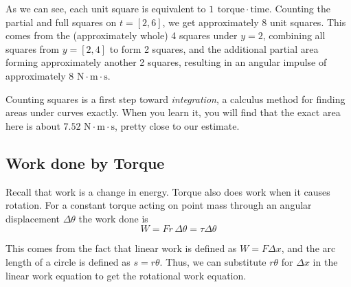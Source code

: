 \begin{Answer}[ref={ex:ang_imp}]
As we can see, each unit square is equivalent to $1 \,\ \mathrm{torque}\cdot \mathrm{time}$. Counting the partial and full squares on $t=[2,6]$, we get approximately 8 unit squares. This comes from the (approximately whole) 4 squares under $y=2$, combining all squares from $y=[2,4]$ to form 2 squares, and the additional partial area forming approximately another 2 squares, resulting in an angular impulse of approximately $8 \text{ N}\cdot \text{m} \cdot \text{s}$. 

Counting squares is a first step toward \emph{integration}, a calculus method for finding areas under curves exactly. When you learn it, you will find that the exact area here is about $7.52 \text{ N}\cdot \text{m} \cdot \text{s}$, pretty close to our estimate.
\end{Answer}
\subsection{Work done by Torque}
Recall that work is a change in energy. Torque also does work when it causes rotation. For a constant torque acting on point mass through an angular displacement $\Delta \theta$ the work done is
\begin{equation}
W = Fr\,\Delta\theta = \tau \Delta \theta
\label{eq:work_rot}
\end{equation}

This comes from the fact that linear work is defined as $W = F \Delta x$, and the arc length of a circle is defined as $s = r \theta$. Thus, we can substitute $r \theta$ for $\Delta x$ in the linear work equation to get the rotational work equation.

